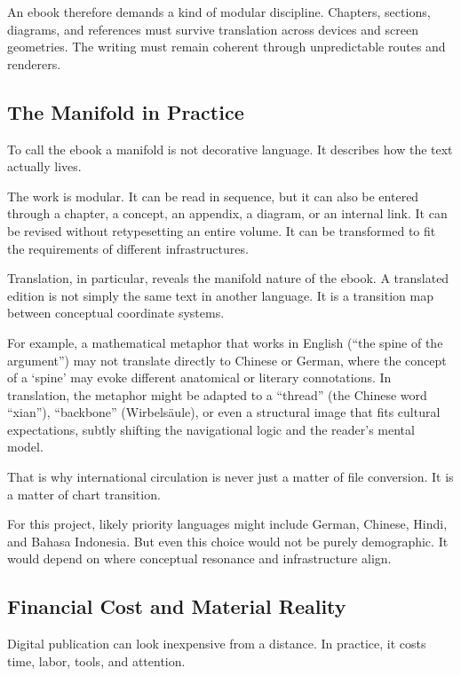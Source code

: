 An ebook therefore demands a kind of modular discipline. Chapters,
sections, diagrams, and references must survive translation across
devices and screen geometries. The writing must remain coherent through
unpredictable routes and renderers.

\hypertarget{the-manifold-in-practice}{%
\subsection{The Manifold in Practice}\label{the-manifold-in-practice}}

To call the ebook a manifold is not decorative language. It describes
how the text actually lives.

The work is modular. It can be read in sequence, but it can also be
entered through a chapter, a concept, an appendix, a diagram, or an
internal link. It can be revised without retypesetting an entire volume.
It can be transformed to fit the requirements of different
infrastructures.

Translation, in particular, reveals the manifold nature of the ebook. A
translated edition is not simply the same text in another language. It
is a transition map between conceptual coordinate systems.

For example, a mathematical metaphor that works in English (``the spine
of the argument'') may not translate directly to Chinese or German,
where the concept of a `spine' may evoke different anatomical or
literary connotations. In translation, the metaphor might be adapted to
a ``thread'' (the Chinese word ``xian''), ``backbone'' (Wirbelsäule), or
even a structural image that fits cultural expectations, subtly shifting
the navigational logic and the reader's mental model.

That is why international circulation is never just a matter of file
conversion. It is a matter of chart transition.

For this project, likely priority languages might include German,
Chinese, Hindi, and Bahasa Indonesia. But even this choice would not be
purely demographic. It would depend on where conceptual resonance and
infrastructure align.

\hypertarget{financial-cost-and-material-reality}{%
\subsection{Financial Cost and Material
Reality}\label{financial-cost-and-material-reality}}

Digital publication can look inexpensive from a distance. In practice,
it costs time, labor, tools, and attention.

